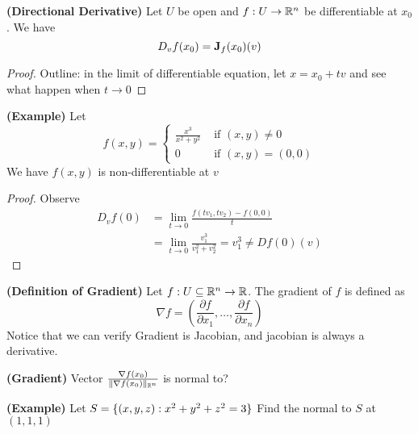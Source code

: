 \documentclass{report}
\begin{document}
\begin{theorem}
\label{4.2.14}
\textbf{(Directional Derivative)} Let $U$ be open and $f:U\rightarrow \mathbb{R}^n$ be differentiable at $x_0$. We have
 \begin{equation}
D_vf(x_0)=\textbf{J}_f(x_0)(v)
\end{equation}
\end{theorem}
\begin{proof}
Outline: in the limit of differentiable equation, let $x=x_0+tv$ and see what happen when  $t \to 0$
\end{proof}
\begin{theorem}
\label{4.2.15}
\textbf{(Example)} Let
\begin{equation}
f(x,y)=\begin{cases}
  \frac{x^3}{x^2+y^2}& \text{ if  }(x,y)\neq 0\\
  0 & \text{ if  }(x,y)=(0,0)
\end{cases}
\end{equation}
We have $f(x,y)$ is non-differentiable at $v$
\end{theorem}
\begin{proof}
Observe
\begin{align}
D_vf(0)&=\lim_{t \to 0}\frac{f(tv_1,tv_2)-f(0,0)}{t}\\
&=\lim_{t\to0}\frac{v_1^3}{v_1^2+v_2^2}=v_1^3\neq Df(0)(v)
\end{align}
\end{proof}
\begin{definition}
\label{4.2.16}
\textbf{(Definition of Gradient)} Let $f:U\subseteq \mathbb{R}^n \rightarrow \mathbb{R}$. The gradient of $f$ is defined as
\begin{equation}
  \nabla f=(\frac{\partial f}{\partial x_1},\dots ,\frac{\partial f}{\partial x_n})
\end{equation}
Notice that we can verify Gradient is Jacobian, and jacobian is always a derivative. 
\end{definition}
\begin{theorem}
\label{4.2.17}
\textbf{(Gradient)} Vector $\frac{\nabla f(x_0)}{\| \nabla f(x_0) \|_{\mathbb{R}^n}}$ is normal to? 

\end{theorem}
\begin{theorem}
\label{4.2.18}
\textbf{(Example)} Let $S=\{ (x,y,z):x^2+y^2+z^2=3 \}$ Find the normal to $S$ at $(1,1,1)$
\end{theorem}
\end{document}

